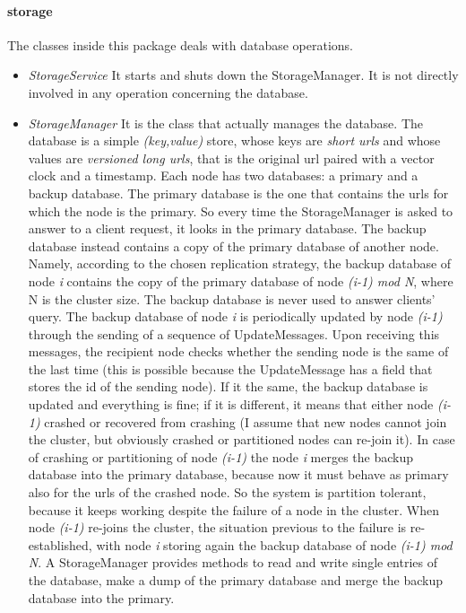 \documentclass{article}
\begin{document}
\paragraph{storage} The classes inside this package deals with database operations.
\begin{itemize}
\item \textit{StorageService} It starts and shuts down the StorageManager. It is not directly involved in any operation concerning the database.
\item \textit{StorageManager} It is the class that actually manages the database. The database is a simple \textit{(key,value)} store, whose keys are \textit{short urls} and whose values are \textit{versioned long urls}, that is the original url paired with a vector clock and a timestamp. Each node has two databases: a primary and a backup database. The primary database is the one that contains the urls for which the node is the primary. So every time the StorageManager is asked to answer to a client request, it looks in the primary database. The backup database instead contains a copy of the primary database of another node. Namely, according to the chosen replication strategy, the backup database of node \textit{i} contains the copy of the primary database of node \textit{(i-1) mod N}, where N is the cluster size. The backup database is never used to answer clients' query. The backup database of node \textit{i} is periodically updated by node \textit{(i-1)} through the sending of a sequence of UpdateMessages. Upon receiving this messages, the recipient node checks whether the sending node is the same of the last time (this is possible because the UpdateMessage has a field that stores the id of the sending node). If it the same, the backup database is updated and everything is fine; if it is different, it means that either node \textit{(i-1)} crashed or recovered from crashing (I assume that new nodes cannot join the cluster, but obviously crashed or partitioned nodes can re-join it). In case of crashing or partitioning of node \textit{(i-1)} the node \textit{i} merges the backup database into the primary database, because now it must behave as primary also for the urls of the crashed node. So the system is partition tolerant, because it keeps working despite the failure of a node in the cluster. When node \textit{(i-1)} re-joins the cluster, the situation previous to the failure is re-established, with node \textit{i} storing again the backup database of node \textit{(i-1) mod N}. A StorageManager provides methods to read and write single entries of the database, make a dump of the primary database and merge the backup database into the primary. 
\end{itemize}
\end{document}
